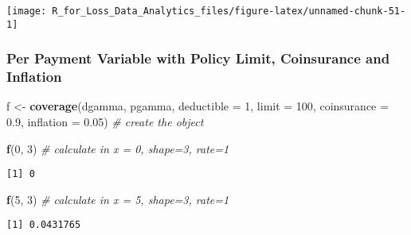 \documentclass[]{book}
\newenvironment{Shaded}{\begin{snugshade}}{\end{snugshade}}
\newcommand{\KeywordTok}[1]{\textcolor[rgb]{0.13,0.29,0.53}{\textbf{#1}}}
\newcommand{\DataTypeTok}[1]{\textcolor[rgb]{0.13,0.29,0.53}{#1}}
\newcommand{\DecValTok}[1]{\textcolor[rgb]{0.00,0.00,0.81}{#1}}
\newcommand{\FloatTok}[1]{\textcolor[rgb]{0.00,0.00,0.81}{#1}}
\newcommand{\StringTok}[1]{\textcolor[rgb]{0.31,0.60,0.02}{#1}}
\newcommand{\CommentTok}[1]{\textcolor[rgb]{0.56,0.35,0.01}{\textit{#1}}}
\newcommand{\NormalTok}[1]{#1}
\theoremstyle{definition}
\theoremstyle{definition}
\theoremstyle{definition}
\theoremstyle{remark}
\begin{document}
\begin{center}\texttt{[image: R\_for\_Loss\_Data\_Analytics\_files/figure-latex/unnamed-chunk-51-1]} \end{center}

\subsubsection{Per Payment Variable with Policy Limit, Coinsurance and
Inflation}\label{per-payment-variable-with-policy-limit-coinsurance-and-inflation}

\begin{Shaded}
\begin{Highlighting}[]
\NormalTok{f <-}\StringTok{ }\KeywordTok{coverage}\NormalTok{(dgamma, pgamma, }\DataTypeTok{deductible =} \DecValTok{1}\NormalTok{, }\DataTypeTok{limit =} \DecValTok{100}\NormalTok{, }\DataTypeTok{coinsurance =} \FloatTok{0.9}\NormalTok{, }\DataTypeTok{inflation =} \FloatTok{0.05}\NormalTok{) }\CommentTok{# create the object}

\KeywordTok{f}\NormalTok{(}\DecValTok{0}\NormalTok{, }\DecValTok{3}\NormalTok{) }\CommentTok{# calculate in x = 0, shape=3, rate=1}
\end{Highlighting}
\end{Shaded}

\begin{verbatim}
[1] 0
\end{verbatim}

\begin{Shaded}
\begin{Highlighting}[]
\KeywordTok{f}\NormalTok{(}\DecValTok{5}\NormalTok{, }\DecValTok{3}\NormalTok{) }\CommentTok{# calculate in x = 5, shape=3, rate=1}
\end{Highlighting}
\end{Shaded}

\begin{verbatim}
[1] 0.0431765
\end{verbatim}
\end{document}
